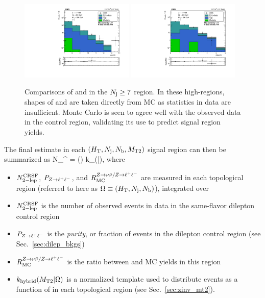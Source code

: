 \begin{figure}[ht]
  \begin{center}
    \includegraphics[width=0.48\textwidth]{figs/zinv/crdybase_nJet30_ge7j.pdf}
    \includegraphics[width=0.48\textwidth]{figs/zinv/crdybase_nBJet20_ge7j.pdf} \\
    \caption{Comparisons of \Nj and \Nb in the $N_{\mathrm{j}}\geq7$ region. In these high-\Nj regions, 
      shapes of \Nj and \Nb are taken directly from MC as statistics in data are insufficient.
      Monte Carlo is seen to agree well with the observed data in the control region, 
      validating its use to predict signal region yields.
            }
    \label{fig:zll_ge7j}
  \end{center}
\end{figure}


The final estimate in each $(H_{\mathrm{T}},N_{\mathrm{j}},N_{\mathrm{b}},M_{\mathrm{T2}})$ signal region can then be summarized as
\be\label{eq:zinv_est}
N_{\znunu}^ = 
(\Omega) \times k_(\mttwo|\Omega),
\ee
where
\begin{itemize}\setlength\itemsep{0mm}
\item $N_{\mathrm{2-lep}}^{\mathrm{CRSF}}$, $P_{Z\to\ell^+\ell^-}$, and $R_{\mathrm{MC}}^{Z\to\nu\bar{\nu}/Z\to\ell^+\ell^-}$ are measured in each topological
region (referred to here as $\Omega\equiv(H_{\mathrm{T}},N_{\mathrm{j}},N_{\mathrm{b}})$), integrated over \mttwo
\item $N_{\mathrm{2-lep}}^{\mathrm{CRSF}}$ is the number of observed events in data in the same-flavor dilepton control region
\item $P_{Z\to\ell^+\ell^-}$ is the \emph{purity}, or fraction of \zll events in the dilepton control region 
(see Sec.~\ref{sec:dilep_bkgs})
\item $R_{\mathrm{MC}}^{Z\to\nu\bar{\nu}/Z\to\ell^+\ell^-}$ is the ratio between \znunu and \zll MC yields in this region
\item $k_{\mathrm{hybrid}}(M_{\mathrm{T2}}|\Omega)$ is a normalized template used to distribute events as a function
of \mttwo in each topological region (see Sec.~\ref{sec:zinv_mt2}).
\end{itemize}

